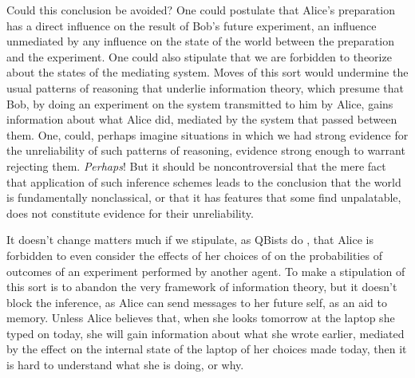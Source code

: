 \documentclass[12pt]{article}
\begin{document}
Could this conclusion be avoided?    One could postulate that Alice's preparation has a direct influence on the result of Bob's future experiment, an influence unmediated by any influence on the state of the world between the preparation and the experiment.   One could also stipulate that we are forbidden to theorize about the states of the mediating system.  Moves of this sort would undermine the usual patterns of reasoning that underlie information theory, which presume that Bob, by doing an experiment on the system transmitted to him by Alice, gains information about what Alice did, mediated by the system that passed between them. One, could, perhaps imagine situations in which we had strong evidence for the unreliability of such patterns of reasoning, evidence strong enough to warrant rejecting them. \emph{Perhaps}!  But it should be noncontroversial that the mere fact that application of such inference schemes leads to the conclusion that the world is fundamentally nonclassical, or that it has features that some find unpalatable, does not constitute evidence for their unreliability.

 It doesn't change matters much if we stipulate, as QBists do \citep{FMSQB}, that Alice is forbidden to even consider the effects of her choices of on the probabilities of outcomes of an experiment performed by another agent.  To make a stipulation of this sort is to abandon the very framework of information theory, but it doesn't block the inference, as Alice can send messages to her future self, as an aid to memory.  Unless Alice believes that, when she looks tomorrow at the laptop  she typed  on  today, she will gain information about what she wrote earlier, mediated by the effect  on the internal state of the laptop of her choices made today, then it is hard to understand what she is doing, or why.
\end{document}
